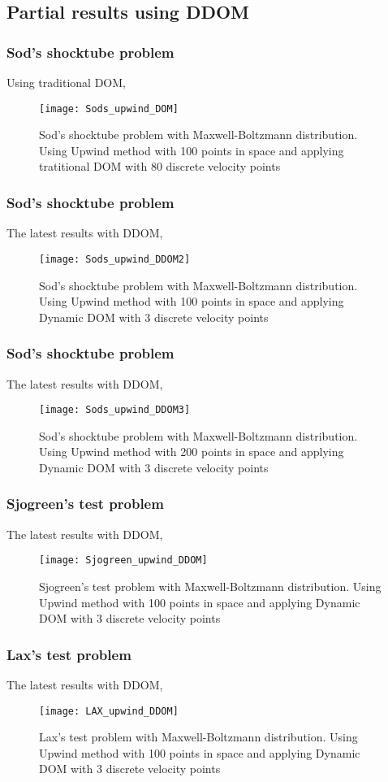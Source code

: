 \subsection{Partial results using DDOM}

\begin{frame}
	\frametitle{Sod's shocktube problem}
	Using traditional DOM,
	\begin{figure}
		\centering
			\texttt{[image: Sods\_upwind\_DOM]}
		\caption{Sod's shocktube problem with Maxwell-Boltzmann distribution. Using Upwind method with 100 points in space and applying tratitional DOM with 80 discrete velocity points}
		\label{fig:Sods_upwind_DOM}
	\end{figure}
\end{frame}

\begin{frame}
	\frametitle{Sod's shocktube problem}
	The latest results with DDOM,
	\begin{figure}
		\centering
			\texttt{[image: Sods\_upwind\_DDOM2]}
		\caption{Sod's shocktube problem with Maxwell-Boltzmann distribution. Using Upwind method with 100 points in space and applying Dynamic DOM with 3 discrete velocity points}
		\label{fig:Sods_upwind_DDOM2}
	\end{figure}
\end{frame}

\begin{frame}
	\frametitle{Sod's shocktube problem}
	The latest results with DDOM,
	\begin{figure}
		\centering
			\texttt{[image: Sods\_upwind\_DDOM3]}
		\caption{Sod's shocktube problem with Maxwell-Boltzmann distribution. Using Upwind method with 200 points in space and applying Dynamic DOM with 3 discrete velocity points}
		\label{fig:Sods_upwind_DDOM3}
	\end{figure}
\end{frame}

\begin{frame}
	\frametitle{Sjogreen's test problem}
	The latest results with DDOM,
	\begin{figure}
		\centering
			\texttt{[image: Sjogreen\_upwind\_DDOM]}
		\caption{Sjogreen's test problem with Maxwell-Boltzmann distribution. Using Upwind method with 100 points in space and applying Dynamic DOM with 3 discrete velocity points}
		\label{fig:Sjgreen_upwind_DDOM}
	\end{figure}
\end{frame}

\begin{frame}
	\frametitle{Lax's test problem}
	The latest results with DDOM,
	\begin{figure}
		\centering
			\texttt{[image: LAX\_upwind\_DDOM]}
		\caption{Lax's test problem with Maxwell-Boltzmann distribution. Using Upwind method with 100 points in space and applying Dynamic DOM with 3 discrete velocity points}
		\label{fig:Lax_upwind_DDOM}
	\end{figure}
\end{frame}